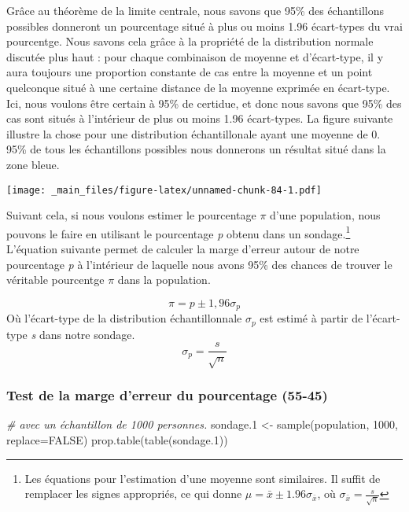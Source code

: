 \documentclass[
]{book}
\newenvironment{Shaded}{\begin{snugshade}}{\end{snugshade}}
\newcommand{\AttributeTok}[1]{\textcolor[rgb]{0.77,0.63,0.00}{#1}}
\newcommand{\CommentTok}[1]{\textcolor[rgb]{0.56,0.35,0.01}{\textit{#1}}}
\newcommand{\ConstantTok}[1]{\textcolor[rgb]{0.00,0.00,0.00}{#1}}
\newcommand{\DecValTok}[1]{\textcolor[rgb]{0.00,0.00,0.81}{#1}}
\newcommand{\FloatTok}[1]{\textcolor[rgb]{0.00,0.00,0.81}{#1}}
\newcommand{\FunctionTok}[1]{\textcolor[rgb]{0.00,0.00,0.00}{#1}}
\newcommand{\NormalTok}[1]{#1}
\newcommand{\OtherTok}[1]{\textcolor[rgb]{0.56,0.35,0.01}{#1}}
\begin{document}
Grâce au théorème de la limite centrale, nous savons que 95\% des échantillons possibles donneront un pourcentage situé à plus ou moins 1.96 écart-types du vrai pourcentge. Nous savons cela grâce à la propriété de la distribution normale discutée plus haut : pour chaque combinaison de moyenne et d'écart-type, il y aura toujours une proportion constante de cas entre la moyenne et un point quelconque situé à une certaine distance de la moyenne exprimée en écart-type. Ici, nous voulons être certain à 95\% de certidue, et donc nous savons que 95\% des cas sont situés à l'intérieur de plus ou moins 1.96 écart-types. La figure suivante illustre la chose pour une distribution échantillonale ayant une moyenne de 0. 95\% de tous les échantillons possibles nous donnerons un résultat situé dans la zone bleue.

\texttt{[image: \_main\_files/figure-latex/unnamed-chunk-84-1.pdf]}

Suivant cela, si nous voulons estimer le pourcentage \(\pi\) d'une population, nous pouvons le faire en utilisant le pourcentage \emph{p} obtenu dans un sondage.\footnote{Les équations pour l'estimation d'une moyenne sont similaires. Il suffit de remplacer les signes appropriés, ce qui donne \(\mu=\bar{x}\pm 1.96 {\sigma}_{\bar{x}}\), où \({\sigma}_{\bar{x}}=\frac{s}{\sqrt{ n }}\)} L'équation suivante permet de calculer la marge d'erreur autour de notre pourcentage \emph{p} à l'intérieur de laquelle nous avons 95\% des chances de trouver le véritable pourcentge \(\pi\) dans la population.

\[\pi=p\pm 1,96 {\sigma}_{p}\]
Où l'écart-type de la distribution échantillonnale \({\sigma}_{p}\) est estimé à partir de l'écart-type \emph{s} dans notre sondage.\\
\[{\sigma}_{p} = \frac { s }{ \sqrt { n }  }\]

\hypertarget{test-de-la-marge-derreur-du-pourcentage-55-45}{%
\subsubsection{Test de la marge d'erreur du pourcentage (55-45)}\label{test-de-la-marge-derreur-du-pourcentage-55-45}}

\begin{Shaded}
\begin{Highlighting}[]
\CommentTok{\# avec un échantillon de 1000 personnes.}
\NormalTok{sondage}\FloatTok{.1} \OtherTok{\textless{}{-}} \FunctionTok{sample}\NormalTok{(population, }\DecValTok{1000}\NormalTok{, }\AttributeTok{replace=}\ConstantTok{FALSE}\NormalTok{)}
\FunctionTok{prop.table}\NormalTok{(}\FunctionTok{table}\NormalTok{(sondage}\FloatTok{.1}\NormalTok{))}
\end{Highlighting}
\end{Shaded}
\end{document}
